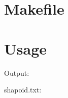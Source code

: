 \documentclass[12pt, a4paper]{article}
\begin{document}
\begin{scriptsize}
\begin{ttfamily}

\end{ttfamily}
\end{scriptsize}

\section{Makefile}

\begin{scriptsize}
\begin{ttfamily}

\end{ttfamily}
\end{scriptsize}

\section{Usage}

\begin{scriptsize}
\begin{ttfamily}

\end{ttfamily}
\end{scriptsize}

Output:\\
\begin{scriptsize}
\begin{ttfamily}

\end{ttfamily}
\end{scriptsize}

shapoid.txt:\\
\begin{scriptsize}
\begin{ttfamily}

\end{ttfamily}
\end{scriptsize}
\end{document}

